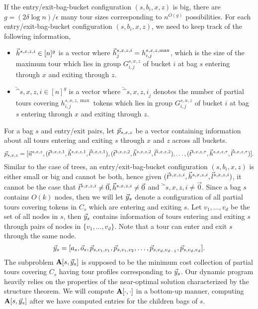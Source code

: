 \documentclass[twoside,leqno]{article}
\newcommand{\eps}{\epsilon}
\begin{document}
If the entry/exit-bag-bucket configuration $(s,b_i,x,z)$ is big, there are $g = (2\delta \log n)/\eps$ many tour sizes corresponding to $n^{O(g)}$ possibilities. For each  entry/exit-bag-bucket configuration $(s,b_i,x,z)$, we need to keep track of the following information, 
\begin{itemize}
    \item $\vec{h}^{s,x,z,i} \in [n]^g$ is a vector where $\vec{h}^{s,x,z,i}_j = h_{i,j}^{s,x,z, \max}$, which is the size of the maximum tour which lies in group $G_{i,j}^{s,x,z}$ of bucket $i$ at bag $s$ entering through $x$ and exiting through $z$. 
    \item $\lvec^{s,x,z,i} \in [n]^g$ is a vector where $\lvec^{s,x,z,i}_j$ denotes the number of partial tours covering $h_{i,j}^{s,x,z, \max}$ tokens which lies in group $G_{i,j}^{s,x,z}$ of bucket $i$ at bag $s$ entering through $x$ and exiting through $z$. 
\end{itemize}
For a bag $s$ and entry/exit pairs, let $\vec{p}_{s,x,z}$ be a vector containing information about all tours entering and exiting $s$ through $x$ and $z$ across all buckets.
$$\vec{p}_{s,x,z} = [\vec{n}^{s,x,z}, (\vec{t}^{s,x,z,1},\vec{h}^{s,x,z,1},\vec{l}^{s,x,z,1}), (\vec{t}^{s,x,z,2},\vec{h}^{s,x,z,2},\vec{l}^{s,x,z,2}), \ldots, (\vec{t}^{s,x,z,\tau},\vec{h}^{s,x,z,\tau},\vec{l}^{s,x,z,\tau}) ]. $$
Similar to the case of trees, an entry/exit-bag-bucket configuration $(s,b_i,x,z)$ is either small or big and cannot be both, hence given $(\vec{t}^{s,x,z,i},\vec{h}^{s,x,z,i},\vec{l}^{s,x,z,i})$, it cannot be the case that $\vec{t}^{s,x,z,i} \neq \vec{0}, \vec{h}^{s,x,z,i} \neq \vec{0}$ and $\lvec^{s,x,z,i} \neq \vec{0}$. Since a bag $s$ contains $O(k)$ nodes, then we will let $\vec{y}_s$ denote a configuration of all partial tours covering tokens in $C_s$ which are entering and exiting $s$. Let $v_1, \ldots, v_d$ be the set of all nodes in $s$, then $\vec{y}_s$ contains information of tours entering and exiting $s$ through pairs of nodes in
$\{v_1, \ldots, v_d\}$. Note that a tour can enter and exit $s$ through the same node. 
$$\vec{y}_s = [a_s, \vec{o}_s, \vec{p}_{s,v_1,v_1}, \vec{p}_{s,v_1,v_2}, \ldots, \vec{p}_{s,v_{d}, v_{d-1}}, \vec{p}_{s, v_d, v_d}]. $$
The subproblem $\textbf{A}[s, \vec{y}_s]$ is supposed to be the minimum cost collection of partial tours covering $C_s$ having tour profiles corresponding to $\vec{y}_s$. Our dynamic program heavily relies on the properties of the near-optimal solution characterized by the structure theorem. We will compute $\textbf{A}[\cdot, \cdot]$ in a bottom-up manner, computing $\textbf{A}[s, \vec{y}_s]$ after we have computed entries for the children bags of $s$. 
\end{document}
